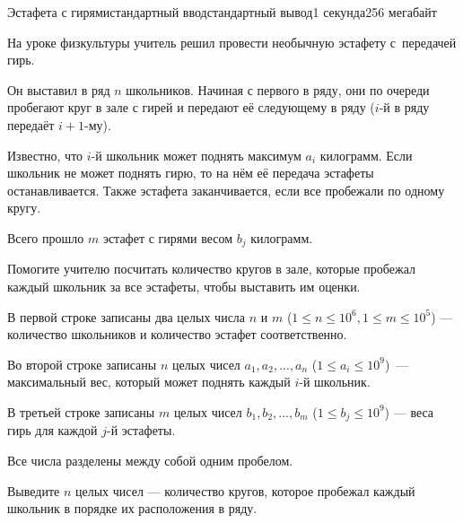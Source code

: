 \begin{problem}{Эстафета с гирями}{стандартный ввод}{стандартный вывод}{1 секунда}{256 мегабайт}

На уроке физкультуры учитель решил провести необычную эстафету с~передачей гирь.

Он выставил в ряд $n$ школьников. Начиная с первого в ряду, они по очереди пробегают круг в зале с гирей и передают её следующему в ряду ($i$-й в ряду передаёт $i+1$-му).

Известно, что $i$-й школьник может поднять максимум $a_i$ килограмм. Если школьник не может поднять гирю, то на нём её передача эстафеты останавливается. Также эстафета заканчивается, если все пробежали по одному кругу. 

Всего прошло $m$ эстафет с гирями весом $b_j$ килограмм.

Помогите учителю посчитать количество кругов в зале, которые пробежал каждый школьник за все эстафеты, чтобы выставить им оценки.

\InputFile
В первой строке записаны два целых числа $n$ и $m$ ($1 \leq n \leq 10^6, 1 \leq m \leq 10^5$) --- количество школьников и количество эстафет соответственно.

Во второй строке записаны $n$ целых чисел $a_1, a_2, ..., a_n$ ($1 \leq a_i \leq 10^9$)~--- максимальный вес, который может поднять каждый $i$-й школьник.

В третьей строке записаны $m$ целых чисел $b_1, b_2, ..., b_m$ ($1 \leq b_j \leq 10^9$) --- веса гирь для каждой $j$-й эстафеты.

Все числа разделены между собой одним пробелом.

\OutputFile
Выведите $n$ целых чисел --- количество кругов, которое пробежал каждый школьник в порядке их расположения в ряду.

\Example

\begin{example}
%
\end{example}

\end{problem}

